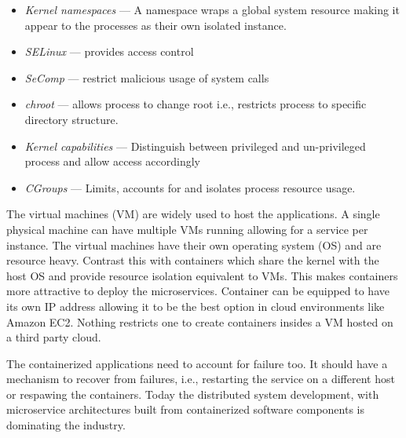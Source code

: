 \documentclass[conference]{IEEEtran}
\begin{document}
\begin{itemize}
\item \textit{Kernel namespaces} --- A namespace wraps a global system resource making it appear to the processes as their own isolated instance.
\item \textit{SELinux} --- provides access control
\item \textit{SeComp} --- restrict malicious usage of system calls
\item \textit{chroot} --- allows process to change root i.e., restricts process to specific directory structure.
\item \textit{Kernel capabilities} --- Distinguish between privileged  and un-privileged  process and allow access accordingly
\item \textit{CGroups} --- Limits, accounts for and isolates process resource usage.
\end{itemize}

The virtual machines (VM) are widely used to host the applications. A single physical machine can have multiple VMs running allowing for a service per instance. The virtual machines have their own operating system (OS) and are resource heavy. Contrast this with containers which share the kernel with the host OS and provide resource isolation equivalent to VMs. This makes containers more attractive to deploy the microservices. Container can be equipped to have its own IP address allowing it to be the best option in cloud environments like Amazon EC2. Nothing restricts one to create containers insides a VM hosted on a third party cloud. \par
The containerized applications need to account for failure too. It should have a mechanism to recover from failures, i.e., restarting the service on a different host or respawing the containers. 
Today the distributed system development, with microservice architectures built from containerized software components \cite{containerPatterns} is dominating the industry.
\end{document}
